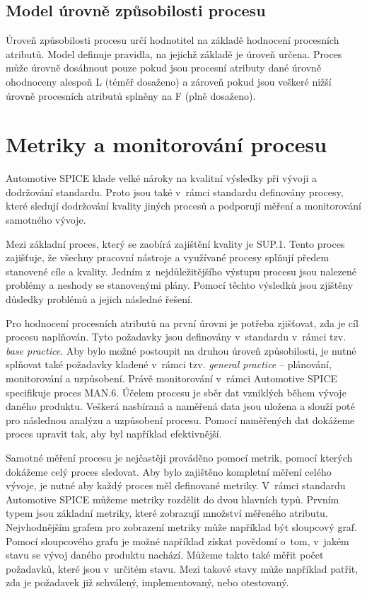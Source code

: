 \documentclass[czech,master]{diploma}
\begin{document}
\subsection{Model úrovně způsobilosti procesu}
Úroveň způsobilosti procesu určí hodnotitel na základě hodnocení procesních atributů. Model definuje  pravidla, na jejichž základě je úroveň určena. Proces může úrovně dosáhnout pouze pokud jsou procesní atributy dané úrovně ohodnoceny alespoň L (téměř dosaženo) a zároveň pokud jsou veškeré nižší úrovně procesních atributů splněny na F (plně dosaženo).


\section{Metriky a monitorování procesu}
Automotive SPICE klade velké nároky na kvalitní výsledky při vývoji a dodržování standardu. Proto jsou také v~rámci standardu definovány procesy, které sledují dodržování kvality jiných procesů a podporují měření a monitorování samotného vývoje. 

Mezi základní proces, který se zaobírá zajištění kvality je SUP.1. Tento proces zajišťuje, že všechny pracovní nástroje a využívané procesy splňují předem stanovené cíle a kvality. Jedním z~nejdůležitějšího výstupu procesu jsou nalezené problémy a neshody se stanovenými plány. Pomocí těchto výsledků jsou zjištěny důsledky problémů a jejich následné řešení.

Pro hodnocení procesních atributů na první úrovni je potřeba zjišťovat, zda je cíl procesu naplňován. Tyto požadavky jsou definovány v~standardu v~rámci tzv. \textit{base practice}. Aby bylo možné postoupit na druhou úroveň způsobilosti, je nutné splňovat také požadavky kladené v~rámci tzv. \textit{general practice} -- plánování, monitorování a uzpůsobení. Právě monitorování v~rámci Automotive SPICE specifikuje proces MAN.6. Účelem procesu je sběr dat vzniklých během vývoje daného produktu. Veškerá nasbíraná a naměřená data jsou uložena a slouží poté pro následnou analýzu a uzpůsobení procesu. Pomocí naměřených dat dokážeme proces upravit tak, aby byl například efektivnější. 

Samotné měření procesu je nejčastěji prováděno pomocí metrik, pomocí kterých dokážeme celý proces sledovat. Aby bylo zajištěno kompletní měření celého vývoje, je nutné aby každý proces měl definované metriky. V~rámci standardu Automotive SPICE můžeme metriky rozdělit do dvou hlavních typů. Prvním typem jsou základní metriky, které zobrazují množství měřeného atributu. Nejvhodnějším grafem pro zobrazení metriky může například být sloupcový graf. Pomocí sloupcového grafu je možné například získat povědomí o~tom, v~jakém stavu se vývoj daného produktu nachází. Můžeme takto také měřit počet požadavků, které jsou v~určitém stavu. Mezi takové stavy může například patřit, zda je požadavek již schválený, implementovaný, nebo otestovaný.
\end{document}
